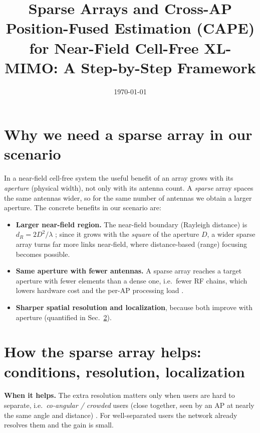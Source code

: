 \documentclass[11pt]{article}
\title{\textbf{Sparse Arrays and Cross-AP Position-Fused Estimation (CAPE)\\for Near-Field Cell-Free XL-MIMO: A Step-by-Step Framework}}
\date{\today}
\begin{document}
\maketitle
\newcommand{\vexp}[2]{\par\smallskip\noindent\textit{Here:} #2}

\section{Why we need a sparse array in our scenario}
In a near-field cell-free system the useful benefit of an array grows with its \emph{aperture}
(physical width), not only with its antenna count. A \emph{sparse} array spaces the same antennas
wider, so for the same number of antennas we obtain a larger aperture. The concrete benefits in our
scenario are:
\begin{itemize}[leftmargin=1.4em,itemsep=1pt]
\item \textbf{Larger near-field region.} The near-field boundary (Rayleigh distance) is
      $d_{R}=2D^{2}/\lambda$ \cite{lu2024tutorial,bjornson2021primer}; since it grows with the
      \emph{square} of the aperture $D$, a wider sparse array turns far more links near-field, where
      distance-based (range) focusing becomes possible.
\item \textbf{Same aperture with fewer antennas.} A sparse array reaches a target aperture with
      fewer elements than a dense one, i.e.\ fewer RF chains, which lowers hardware cost and the
      per-AP processing load \cite{wang2024xltutorial,zhou2025sparse}.
\item \textbf{Sharper spatial resolution and localization}, because both improve with aperture
      \cite{zhou2025sparse,chen2024nearfield} (quantified in Sec.~\ref{sec:res}).
\end{itemize}

\section{How the sparse array helps: conditions, resolution, localization}\label{sec:res}
\textbf{When it helps.} The extra resolution matters only when users are hard to separate, i.e.\
\emph{co-angular / crowded} users (close together, seen by an AP at nearly the same angle and
distance) \cite{chen2024nearfield}. For well-separated users the network already resolves them and
the gain is small.
\end{document}

